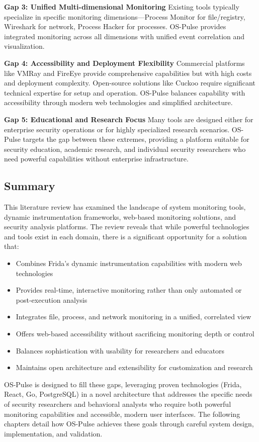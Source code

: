 \textbf{Gap 3: Unified Multi-dimensional Monitoring}
Existing tools typically specialize in specific monitoring dimensions—Process Monitor for file/registry, Wireshark for network, Process Hacker for processes. OS-Pulse provides integrated monitoring across all dimensions with unified event correlation and visualization.

\textbf{Gap 4: Accessibility and Deployment Flexibility}
Commercial platforms like VMRay and FireEye provide comprehensive capabilities but with high costs and deployment complexity. Open-source solutions like Cuckoo require significant technical expertise for setup and operation. OS-Pulse balances capability with accessibility through modern web technologies and simplified architecture.

\textbf{Gap 5: Educational and Research Focus}
Many tools are designed either for enterprise security operations or for highly specialized research scenarios. OS-Pulse targets the gap between these extremes, providing a platform suitable for security education, academic research, and individual security researchers who need powerful capabilities without enterprise infrastructure.

\subsection{Summary}

This literature review has examined the landscape of system monitoring tools, dynamic instrumentation frameworks, web-based monitoring solutions, and security analysis platforms. The review reveals that while powerful technologies and tools exist in each domain, there is a significant opportunity for a solution that:

\begin{itemize}
    \item Combines Frida's dynamic instrumentation capabilities with modern web technologies
    \item Provides real-time, interactive monitoring rather than only automated or post-execution analysis
    \item Integrates file, process, and network monitoring in a unified, correlated view
    \item Offers web-based accessibility without sacrificing monitoring depth or control
    \item Balances sophistication with usability for researchers and educators
    \item Maintains open architecture and extensibility for customization and research
\end{itemize}

OS-Pulse is designed to fill these gaps, leveraging proven technologies (Frida, React, Go, PostgreSQL) in a novel architecture that addresses the specific needs of security researchers and behavioral analysts who require both powerful monitoring capabilities and accessible, modern user interfaces. The following chapters detail how OS-Pulse achieves these goals through careful system design, implementation, and validation.